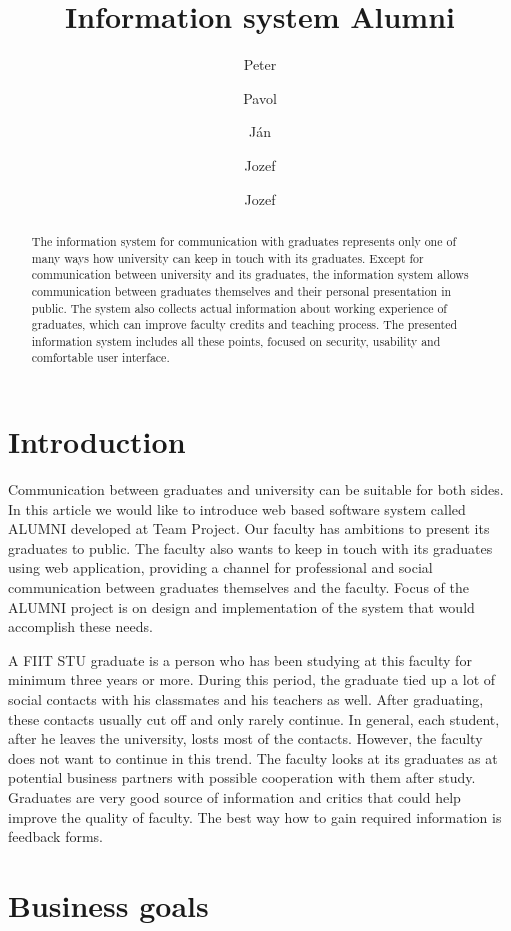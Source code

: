\documentclass{iitsrc}[2006/14/02]
\title{Information system Alumni}
\author{Peter}{C\'ich}
\author{Pavol}{F\'abik}
\author{J\'an}{Garaj}
\author{Jozef}{Hergott}
\author{Jozef}{Hopko}
\begin{document}
\begin{abstract}
The information system for communication with graduates represents only one of many ways how university can keep in touch with its graduates. Except for communication between university and its graduates, the information system allows communication between graduates themselves and their personal presentation in public. The system also collects actual information about working experience of graduates, which can improve faculty credits and teaching process. The presented information system includes all these points, focused on security, usability and comfortable user interface.
\end{abstract}


\section{Introduction}

Communication between graduates and university can be suitable for both sides. In this article we would like to introduce web based software system called ALUMNI developed at Team Project. Our faculty has ambitions to present its graduates to public. The faculty also wants to keep in touch with its graduates using web application, providing a channel for professional and social communication between graduates themselves and the faculty. Focus of the ALUMNI project is on design and implementation of the system that would accomplish these needs. 

A FIIT STU graduate is a person who has been studying at this faculty for minimum three years or more. During this period, the graduate tied up a lot of social contacts with his classmates and his teachers as well. After graduating, these contacts usually cut off and only rarely continue. In general, each student, after he leaves the university, losts most of the contacts. However, the faculty does not want to continue in this trend. The faculty looks at its graduates as at potential business partners with possible cooperation with them after study. Graduates are very good source of information and critics that could help improve the quality of faculty. The best way how to gain required information is feedback forms.


\section{Business goals}
\end{document}
